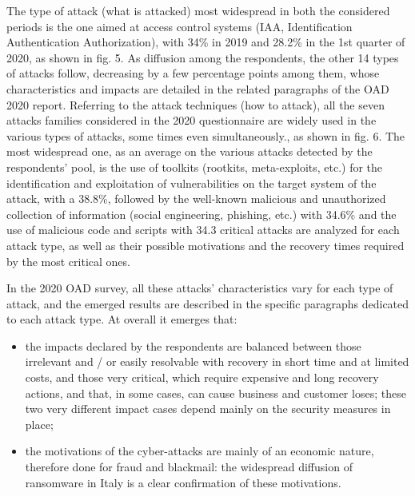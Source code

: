 \documentclass{easychair}
\begin{document}

The type of attack (what is attacked) most widespread in both the considered periods is the one aimed at access control systems (IAA, Identification Authentication Authorization), 
with 34\% in 2019 and 28.2\% in the 1st quarter of 2020, as shown in fig. 5. As diffusion among the respondents, the other 14 types of attacks follow, decreasing by a few percentage
points among them, whose characteristics and impacts are detailed in the related paragraphs of the OAD 2020 report. Referring to the attack techniques (how to attack), all the seven
attacks families considered in the 2020 questionnaire are widely used in the various types of attacks, some times even simultaneously., as shown in fig. 6. The most widespread one,
as an average on the various attacks detected by the respondents’ pool, is the use of toolkits (rootkits, meta-exploits, etc.) for the identification and exploitation of vulnerabilities
on the target system of the attack, with a 38.8\%, followed by the well-known malicious and unauthorized collection of information (social engineering, phishing, etc.) with 34.6\% 
and the use of malicious code and scripts with 34.3%
critical attacks are analyzed for each attack type, as well as their possible motivations and the recovery times required by the most critical ones.

In the 2020 OAD survey, all these attacks’ characteristics vary for each type of attack, and the emerged results are described in the specific paragraphs dedicated to each attack 
type. At overall it emerges that:
\begin{itemize}
\item the impacts declared by the respondents are balanced between those irrelevant and / or easily resolvable with recovery in short time and at limited costs, and those very 
critical, which require expensive and long recovery actions, and that, in some cases, can cause business and customer loses; these two very different impact cases depend mainly 
on the security measures in place;

\item the motivations of the cyber-attacks are mainly of an economic nature, therefore done for fraud and blackmail: the widespread diffusion of ransomware in Italy is a clear 
confirmation of these motivations.
\end{itemize}
\end{document}

